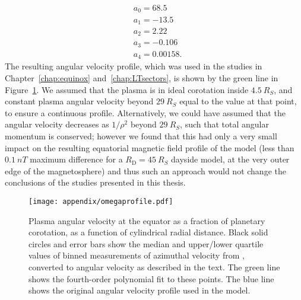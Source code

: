 \begin{align}
& a_0 =  68.5 \\
& a_1 = -13.5 \nonumber \\
& a_2 =  2.22 \nonumber \\
&  a_3 =  -0.106 \nonumber \\
& a_4 =  0.00158. \nonumber
\end{align}
The resulting angular velocity profile, which was used in the studies in Chapter~\ref{chap:equinox} and~\ref{chap:LTsectors}, is shown by the green line in Figure~\ref{appendix:fig:omegaprofile}. We assumed that the plasma is in ideal corotation inside $\SI{4.5}{R_S}$, and constant plasma angular velocity beyond $\SI{29}{R_S}$ equal to the value at that point, to ensure a continuous profile. Alternatively, we could have assumed that the angular velocity decreases as $1/\rho^2$ beyond $\SI{29}{R_S}$, such that total angular momentum is conserved; however we found that this had only a very small impact on the resulting equatorial magnetic field profile of the model (less than $\SI{0.1}{nT}$ maximum difference for a $R_\mathrm{D} = \SI{45}{R_S}$ dayside model, at the very outer edge of the magnetosphere) and thus such an approach would not change the conclusions of the studies presented in this thesis.
\begin{figure}
\centering
\texttt{[image: appendix/omegaprofile.pdf]}
\caption[Equatorial profile of plasma angular velocity from \citet{wilson2017}, with best fit polynomial.]{Plasma angular velocity at the equator as a fraction of planetary corotation, as a function of cylindrical radial distance. Black solid circles and error bars show the median and upper/lower quartile values of binned measurements of azimuthal velocity from \citet{wilson2017}, converted to angular velocity as described in the text. The green line shows the fourth-order polynomial fit to these points. The blue  line shows the original angular velocity profile used in the \citet{achilleos2010a} model.}
\label{appendix:fig:omegaprofile}
\end{figure}

